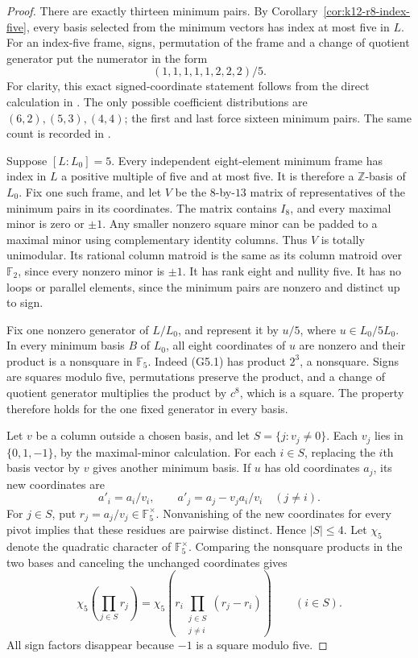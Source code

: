 \documentclass[11pt,a4paper]{article}
\theoremstyle{definition}
\begin{document}
\begin{proof}
There are exactly thirteen minimum pairs.  By
Corollary~\ref{cor:k12-r8-index-five}, every basis selected from
the minimum vectors has index at most five in \(L\).
For an index-five frame, signs, permutation of the frame and a
change of quotient generator put the numerator in the form
\[
                         (1,1,1,1,1,2,2,2)/5.              \tag{G5.1}
\]
For clarity, this exact signed-coordinate statement follows from
the direct calculation in
\cite[\S9, case \(d=5\), p.~31; Proposition~9.1 and full proof,
p.~33]{MartinetIndex2001}.
The only possible coefficient distributions are
\((6,2),(5,3),(4,4)\); the first and last force sixteen
minimum pairs.  The same count is recorded in
\cite[complement to \S7, p.~4]{MartinetIndexErrata2014}.

Suppose \([L:L_0]=5\).  Every independent eight-element minimum
frame has index in \(L\) a positive multiple of five and at most
five.  It is therefore a \(\mathbb Z\)-basis of \(L_0\).
Fix one such frame, and let \(V\) be the \(8\)-by-\(13\) matrix
of representatives of the minimum pairs in its coordinates.
The matrix contains \(I_8\), and every maximal minor is zero or
\(\pm1\).  Any smaller nonzero square minor can be padded to
a maximal minor using complementary identity columns.
Thus \(V\) is totally unimodular.
Its rational column matroid is the same as its column matroid
over \(\mathbb F_2\), since every nonzero minor is \(\pm1\).
It has rank eight and nullity five.  It has no loops or
parallel elements, since the minimum pairs are nonzero and
distinct up to sign.

Fix one nonzero generator of \(L/L_0\), and represent it by
\(u/5\), where \(u\in L_0/5L_0\).
In every minimum basis \(B\) of \(L_0\), all eight coordinates
of \(u\) are nonzero and their product is a nonsquare in
\(\mathbb F_5\).  Indeed (G5.1) has product \(2^3\), a
nonsquare.  Signs are squares modulo five, permutations
preserve the product, and a change of quotient generator
multiplies the product by \(c^8\), which is a square.
The property therefore holds for the one fixed generator
in every basis.

Let \(v\) be a column outside a chosen basis, and let
\(S=\{j:v_j\ne0\}\).  Each \(v_j\) lies in \(\{0,1,-1\}\),
by the maximal-minor calculation.  For each \(i\in S\),
replacing the \(i\)th basis vector by \(v\) gives another
minimum basis.  If \(u\) has old coordinates \(a_j\), its
new coordinates are
\[
 a'_i=a_i/v_i,\qquad
 a'_j=a_j-v_j a_i/v_i\quad(j\ne i).
                                                               \tag{G5.2}
\]
For \(j\in S\), put \(r_j=a_j/v_j\in\mathbb F_5^\times\).
Nonvanishing of the new coordinates for every pivot implies
that these residues are pairwise distinct.  Hence \(|S|\le4\).
Let \(\chi_5\) denote the quadratic character of
\(\mathbb F_5^\times\).
Comparing the nonsquare products in the two bases and
canceling the unchanged coordinates gives
\[
 \chi_5\left(\prod_{j\in S}r_j\right)
 =
 \chi_5\left(r_i\prod_{\substack{j\in S\\j\ne i}}(r_j-r_i)\right)
 \qquad(i\in S).                                             \tag{G5.3}
\]
All sign factors disappear because \(-1\) is a square
modulo five.


\end{proof}
\end{document}
